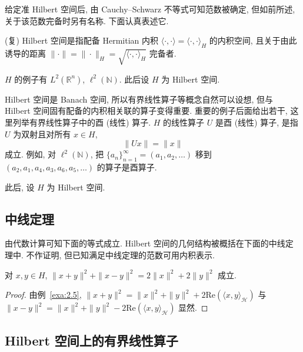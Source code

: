给定准 Hilbert 空间后, 由 Cauchy--Schwarz 不等式可知范数被确定, 但如前所述, 关于该范数完备时另有名称. 下面认真表述它.

\begin{definition}\label{def:2.22}
(复) Hilbert 空间是指配备 Hermitian 内积 $\langle \cdot, \cdot \rangle = \langle \cdot, \cdot \rangle_{H}$ 的内积空间, 且关于由此诱导的距离 $\|\cdot\| = \|\cdot\|_{H} = \sqrt{\langle \cdot, \cdot \rangle_{H}}$ 完备者.
\end{definition}

$H$ 的例子有 $L^{2}(\mathbb{R}^{n})$, $\ell^{2}(\mathbb{N})$. 此后设 $H$ 为 Hilbert 空间.

Hilbert 空间是 Banach 空间, 所以有界线性算子等概念自然可以设想, 但与 Hilbert 空间固有配备的内积相关联的算子变得重要. 重要的例子后面给出若干, 这里列举有界线性算子中的酉 (线性) 算子. $H$ 的线性算子 $U$ 是酉 (线性) 算子, 是指 $U$ 为双射且对所有 $x \in H$,
\begin{equation}\tag{2.7}
\|Ux\| = \|x\|
\label{eq:2.7}
\end{equation}
成立. 例如, 对 $\ell^{2}(\mathbb{N})$, 把 $\{a_{n}\}_{n=1}^{\infty} = (a_{1}, a_{2}, \ldots)$ 移到 $(a_{2}, a_{1}, a_{4}, a_{3}, a_{6}, a_{5}, \ldots)$ 的算子是酉算子.

此后, 设 $H$ 为 Hilbert 空间.

\subsection*{中线定理}

由代数计算可知下面的等式成立. Hilbert 空间的几何结构被概括在下面的中线定理中. 不作证明, 但已知满足中线定理的范数可用内积表示.

\begin{theorem}[中线定理]\label{thm:2.26}
对 $x, y \in H$, $\|x + y\|^{2} + \|x - y\|^{2} = 2\|x\|^{2} + 2\|y\|^{2}$ 成立.
\end{theorem}

\begin{proof}
由例~\ref{exa:2.5}, $\|x + y\|^{2} = \|x\|^{2} + \|y\|^{2} + 2\mathrm{Re}(\langle x, y \rangle_{\mathcal{H}})$ 与 $\|x - y\|^{2} = \|x\|^{2} + \|y\|^{2} - 2\mathrm{Re}(\langle x, y \rangle_{\mathcal{H}})$ 显然.
\end{proof}

\subsection*{Hilbert 空间上的有界线性算子}

